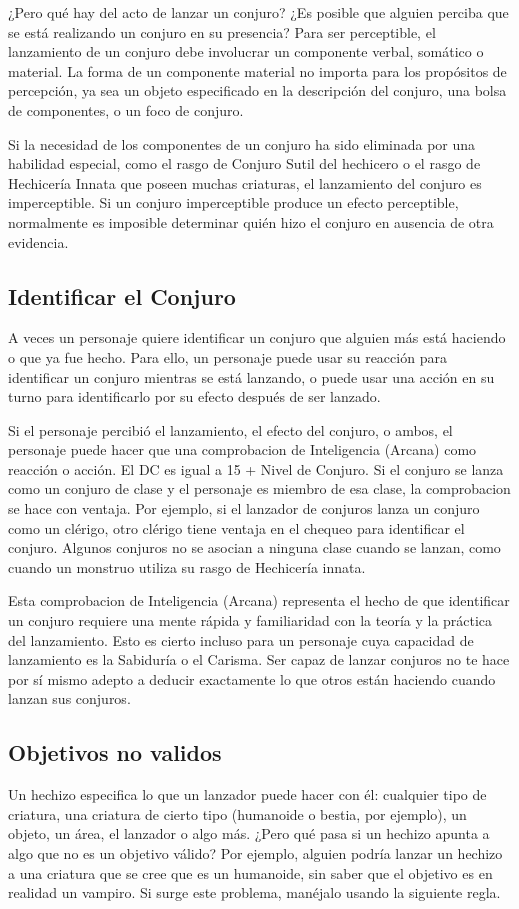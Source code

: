 \documentclass[a4paper,twocolumn,openany,10pt]{dndbook}
\begin{document}
¿Pero qué hay del acto de lanzar un conjuro? ¿Es posible que alguien perciba que se está realizando un conjuro en su presencia?
Para ser perceptible, el lanzamiento de un conjuro debe involucrar un componente verbal, somático o material. La forma de un
componente material no importa para los propósitos de percepción, ya sea un objeto especificado en la descripción del conjuro,
una bolsa de componentes, o un foco de conjuro.

Si la necesidad de los componentes de un conjuro ha sido eliminada por una habilidad especial, como el rasgo de Conjuro Sutil del
hechicero o el rasgo de Hechicería Innata que poseen muchas criaturas, el lanzamiento del conjuro es imperceptible. Si un conjuro
imperceptible produce un efecto perceptible, normalmente es imposible determinar quién hizo el conjuro en ausencia de otra
evidencia.

\subsection{Identificar el Conjuro}
A veces un personaje quiere identificar un conjuro que alguien más está haciendo o que ya fue hecho. Para ello, un personaje
puede usar su reacción para identificar un conjuro mientras se está lanzando, o puede usar una acción en su turno para
identificarlo por su efecto después de ser lanzado.

Si el personaje percibió el lanzamiento, el efecto del conjuro, o ambos, el personaje puede hacer que una comprobacion de
Inteligencia (Arcana) como reacción o acción. El DC es igual a 15 + Nivel de Conjuro. Si el conjuro se lanza como un conjuro de
clase y el personaje es miembro de esa clase, la comprobacion se hace con ventaja. Por ejemplo, si el lanzador de conjuros lanza
un conjuro como un clérigo, otro clérigo tiene ventaja en el chequeo para identificar el conjuro. Algunos conjuros no se asocian
a ninguna clase cuando se lanzan, como cuando un monstruo utiliza su rasgo de Hechicería innata.

Esta comprobacion de Inteligencia (Arcana) representa el hecho de que identificar un conjuro requiere una mente rápida y
familiaridad con la teoría y la práctica del lanzamiento. Esto es cierto incluso para un personaje cuya capacidad de lanzamiento
es la Sabiduría o el Carisma. Ser capaz de lanzar conjuros no te hace por sí mismo adepto a deducir exactamente lo que otros están
haciendo cuando lanzan sus conjuros.

\subsection{Objetivos no validos}
Un hechizo especifica lo que un lanzador puede hacer con él: cualquier tipo de criatura, una criatura de cierto tipo (humanoide o
bestia, por ejemplo), un objeto, un área, el lanzador o algo más. ¿Pero qué pasa si un hechizo apunta a algo que no es un
objetivo válido? Por ejemplo, alguien podría lanzar un hechizo a una criatura que se cree que es un humanoide, sin saber que el
objetivo es en realidad un vampiro. Si surge este problema, manéjalo usando la siguiente regla.
\end{document}
